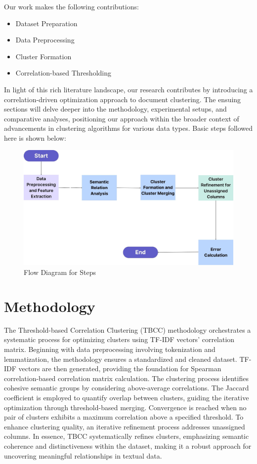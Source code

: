 \documentclass{article}
\begin{document}
Our work makes the following contributions:
\begin{itemize}
    \item Dataset Preparation
    \item Data Preprocessing
    \item Cluster Formation
    \item Correlation-based Thresholding
\end{itemize}
In light of this rich literature landscape, our research contributes by introducing a correlation-driven optimization approach to document clustering. The ensuing sections will delve deeper into the methodology, experimental setups, and comparative analyses, positioning our approach within the broader context of advancements in clustering algorithms for various data types. Basic steps followed here is shown below: 
\begin{figure}[ht]
    \centering
    \includegraphics[width=1\linewidth]{flow.jpg}
    \caption{Flow Diagram for Steps}
    \label{fig:graph4}
\end{figure}

\section{Methodology}
The Threshold-based Correlation Clustering (TBCC) methodology orchestrates a systematic process for optimizing clusters using TF-IDF vectors' correlation matrix. Beginning with data preprocessing involving tokenization and lemmatization, the methodology ensures a standardized and cleaned dataset. TF-IDF vectors are then generated, providing the foundation for Spearman correlation-based correlation matrix calculation. The clustering process identifies cohesive semantic groups by considering above-average correlations. The Jaccard coefficient is employed to quantify overlap between clusters, guiding the iterative optimization through threshold-based merging. Convergence is reached when no pair of clusters exhibits a maximum correlation above a specified threshold. To enhance clustering quality, an iterative refinement process addresses unassigned columns.
In essence, TBCC systematically refines clusters, emphasizing semantic coherence and distinctiveness within the dataset, making it a robust approach for uncovering meaningful relationships in textual data.
\end{document}
